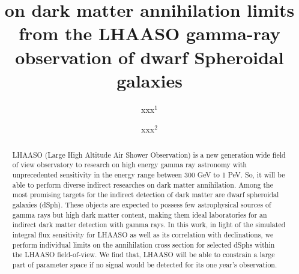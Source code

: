 \documentclass[12pt,prd,showpacs,amsmath,amssymb,aps,floats,floatfix,nofootinbib]{revtex4-1}
\begin{document}
\title{on dark matter annihilation limits from  the LHAASO gamma-ray observation of dwarf Spheroidal galaxies}

\author{xxx$^1$}
\author{xxx$^2$}



\begin{abstract}
LHAASO (Large High Altitude Air Shower Observation) is a new generation wide field of view observatory to research on high energy gamma ray astronomy with unprecedented sensitivity in the energy range between 300 GeV to 1 PeV. So, it will be able to perform diverse indirect researches on dark matter annihilation.
Among the most promising targets for the indirect detection of dark matter are dwarf spheroidal galaxies (dSph). These objects are expected to possess few astrophysical sources of gamma rays but high dark matter content, making them ideal laboratories for an indirect dark matter detection with gamma rays. In this work, in light of the simulated integral flux sensitivity for LHAASO as well as its correlation with declinations, we perform individual limits on the annihilation cross section for selected dSphs within the LHAASO field-of-view. We find that, LHAASO will be able to constrain a large part of parameter space if no signal would be detected for its one year's observation.


\end{abstract}



\maketitle



\end{document}
